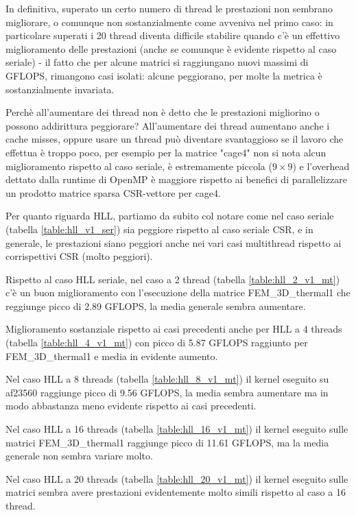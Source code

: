 \documentclass[a4paper,9pt]{extarticle}
\begin{document}
In definitiva, superato un certo numero di thread le prestazioni non sembrano migliorare, o
comunque non sostanzialmente come avveniva nel primo caso: in particolare superati i 20 thread
diventa difficile stabilire quando c'è un effettivo miglioramento delle prestazioni (anche se 
comunque è evidente rispetto al caso seriale) - il fatto
che per alcune matrici si raggiungano nuovi massimi di GFLOPS, rimangono casi isolati: alcune
peggiorano, per molte la metrica è sostanzialmente invariata.

Perchè all'aumentare dei thread non è detto che le prestazioni migliorino o possono addirittura
peggiorare? All'aumentare dei thread aumentano anche i cache misses, oppure usare un thread può
diventare svantaggioso se il lavoro che effettua è troppo poco, per esempio per la matrice
"cage4" non si nota alcun miglioramento rispetto al caso seriale, è estremamente piccola ($9\times9$) 
e l'overhead dettato dalla runtime di OpenMP è maggiore rispetto ai benefici di parallelizzare
un prodotto matrice sparsa CSR-vettore per cage4.

Per quanto riguarda HLL, partiamo da subito col notare come nel caso seriale (tabella 
\ref{table:hll_v1_ser}) sia peggiore rispetto al caso seriale CSR, e in generale, le prestazioni
siano peggiori anche nei vari casi multithread rispetto ai corrispettivi CSR (molto peggiori).

Rispetto al caso HLL seriale, nel caso a 2 thread (tabella \ref{table:hll_2_v1_mt}) c'è un buon 
miglioramento con l'esecuzione della matrice FEM\_3D\_thermal1 che reggiunge picco di 2.89 GFLOPS,
la media generale sembra aumentare.

Miglioramento sostanziale rispetto ai casi precedenti anche per HLL a 4 threads (tabella 
\ref{table:hll_4_v1_mt}) con picco di 5.87 GFLOPS raggiunto per FEM\_3D\_thermal1 e media in
evidente aumento.

Nel caso HLL a 8 threads (tabella \ref{table:hll_8_v1_mt}) il kernel eseguito su af23560
raggiunge picco di 9.56 GFLOPS, la media sembra aumentare ma in modo abbastanza meno evidente
rispetto ai casi precedenti.

Nel caso HLL a 16 threads (tabella \ref{table:hll_16_v1_mt}) il kernel eseguito sulle matrici
FEM\_3D\_thermal1 raggiunge picco di 11.61 GFLOPS, ma la media generale non sembra variare molto.

Nel caso HLL a 20 threads (tabella \ref{table:hll_20_v1_mt}) il kernel eseguito sulle matrici
sembra avere prestazioni evidentemente molto simili rispetto al caso a 16 thread.
\end{document}
